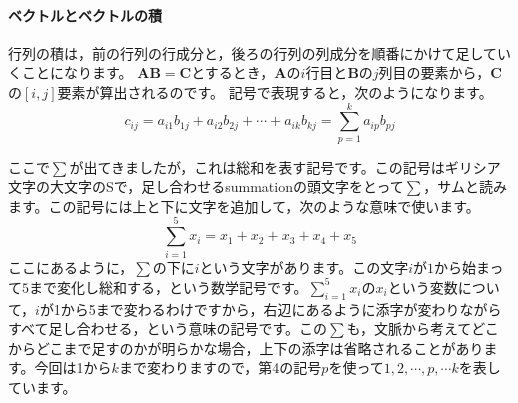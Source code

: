 \documentclass{ltjsbook}
\begin{document}
\paragraph{ベクトルとベクトルの積}
行列の積は，前の行列の行成分と，後ろの行列の列成分を順番にかけて足していくことになります。
$\bm{AB}=\bm{C}$とするとき，$\bm{A}$の$i$行目と$\bm{B}$の$j$列目の要素から，$\bm{C}$の$[i,j]$要素が算出されるのです。
記号で表現すると，次のようになります。
\[ c_{ij} = a_{i1}b_{1j} + a_{i2}b_{2j} + \cdots + a_{ik}b_{kj} = \sum_{p=1}^k a_{ip}b_{pj} \]

ここで$\sum$が出てきましたが，これは総和を表す記号です。この記号はギリシア文字の大文字のSで，足し合わせるsummationの頭文字をとって$\sum$，サムと読みます。この記号には上と下に文字を追加して，次のような意味で使います。
\[ \sum_{i=1}^5 x_i= x_1 + x_2 + x_3 + x_4 + x_5  \]
ここにあるように，$\sum$の下に$i$という文字があります。この文字$i$が$1$から始まって$5$まで変化し総和する，という数学記号です。$\sum_{i=1}^5 x_i$の$x_i$という変数について，$i$が1から5まで変わるわけですから，右辺にあるように添字が変わりながらすべて足し合わせる，という意味の記号です。この$\sum$も，文脈から考えてどこからどこまで足すのかが明らかな場合，上下の添字は省略されることがあります。今回は1から$k$まで変わりますので，第4の記号$p$を使って$1,2,\cdots,p,\cdots k$を表しています。
\end{document}
